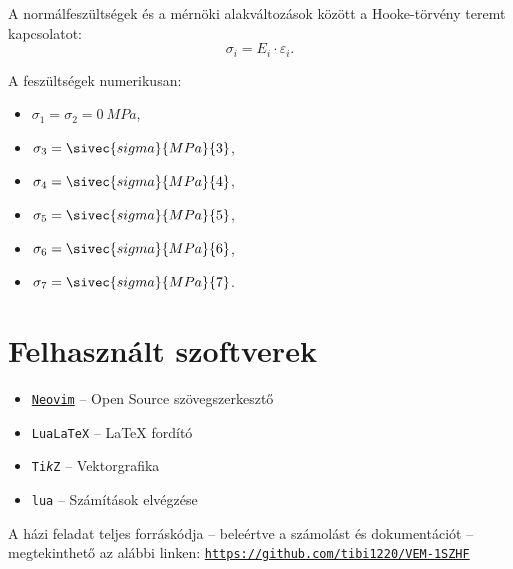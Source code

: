 \documentclass[a4paper, 12pt]{scrartcl}
\begin{document}
A normálfeszültségek és a mérnöki alakváltozások között a Hooke-törvény teremt
kapcsolatot:
\begin{equation}
  \sigma_i = E_i \cdot \varepsilon_i.
  \label{eq:Hooke}
\end{equation}

A feszültségek numerikusan:
\begin{multicols}{3}
  \begin{itemize}
    \item $\sigma_1 = \sigma_2 = \SI{0}{MPa}$,
    \item $\sigma_3 = \sivec{sigma}{MPa}{3}$,
    \item $\sigma_4 = \sivec{sigma}{MPa}{4}$,
    \item $\sigma_5 = \sivec{sigma}{MPa}{5}$,
    \item $\sigma_6 = \sivec{sigma}{MPa}{6}$,
    \item $\sigma_7 = \sivec{sigma}{MPa}{7}$.
  \end{itemize}
\end{multicols}




\vfill

\section*{Felhasznált szoftverek}

\begin{itemize}
  \item \href{https://neovim.io}{\texttt{Neovim}}
        \tabto{3.9cm} – \tabto{4.7cm}
        Open Source szövegszerkesztő

  \item \texttt{Lua\LaTeX}
        \tabto{3.9cm} – \tabto{4.7cm}
        \LaTeX{} fordító

  \item \texttt{Ti\textit{k}Z}
        \tabto{3.9cm} – \tabto{4.7cm}
        Vektorgrafika

  \item \texttt{lua}
        \tabto{3.9cm} – \tabto{4.7cm}
        Számítások elvégzése
\end{itemize}

A házi feladat teljes forráskódja -- beleértve a számolást és dokumentációt --
megtekinthető az alábbi linken:
\texttt{\href{https://github.com/tibi1220/VEM-1SZHF}{https://github.com/tibi1220/VEM-1SZHF}}
\end{document}
